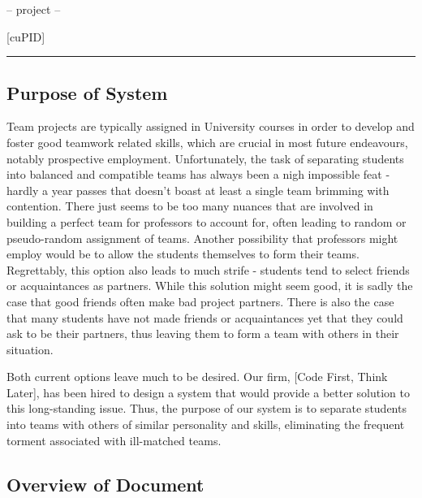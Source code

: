 \documentclass[12pt,letterpaper]{article}
\begin{document}
\begin{center}
-- project --
\end{center}

\begin{center}
{\Huge [cuPID]}
\end{center}

\begin{center}
\rule{0.85\textwidth}{0.5pt}
\end{center}

\subsection{Purpose of System}

Team projects are typically assigned in University courses in order to develop and foster
good teamwork related skills, which are crucial in most future endeavours, notably 
prospective employment. Unfortunately, the task of separating students into balanced 
and compatible teams has always been a nigh impossible feat - hardly a year passes that doesn't
boast at least a single team brimming with  contention. There just seems to be too many
nuances that are involved in building a perfect team for professors to account for, often leading
to random or pseudo-random assignment of teams. Another possibility that professors might employ
would be to allow the students themselves to form their teams. Regrettably, this option also
leads to much strife - students tend to select friends or acquaintances as partners. While this
solution might seem good, it is sadly the case that good friends often make bad project partners. 
There is also the case that many students have not made friends or acquaintances yet that they 
could ask to be their partners, thus leaving them to form a team with others in their situation.

Both current options leave much to be desired. Our firm, [Code First, Think Later], has been hired
to design a system that would provide a better solution to this long-standing issue. Thus, the purpose of
our system is to separate students into teams with others of similar personality and skills, eliminating 
the frequent torment associated with ill-matched teams.

\subsection{Overview of Document}



\vspace{1em}
\end{document}
